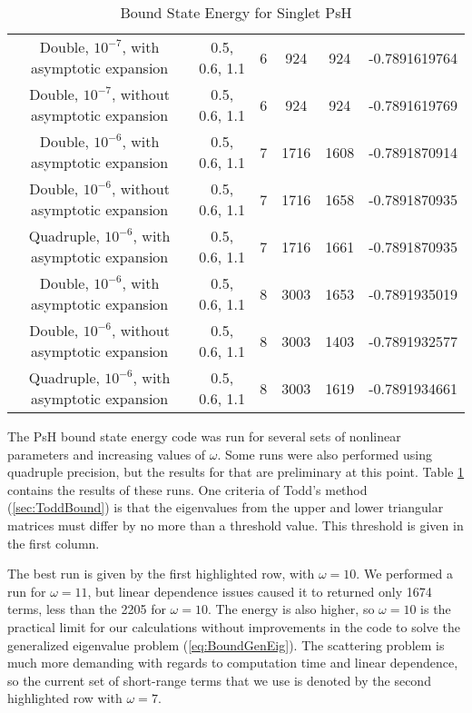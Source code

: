 \documentclass[Dissertation.tex]{subfiles}
\begin{document}
\begin{table}[H]
\begin{center}
\begin{tabular}{|c|c|c|c|c|c|}
Double, $10^{-7}$, with asymptotic expansion & 0.5, 0.6, 1.1 & 6 & 924 & 924 & -0.7891619764\\
Double, $10^{-7}$, without asymptotic expansion & 0.5, 0.6, 1.1 & 6 & 924 & 924 & -0.7891619769\\
\rowcolor{LightCyan}
Double, $10^{-6}$, with asymptotic expansion & 0.5, 0.6, 1.1 & 7 & 1716 & 1608 & -0.7891870914\\
Double, $10^{-6}$, without asymptotic expansion & 0.5, 0.6, 1.1 & 7 & 1716 & 1658 & -0.7891870935\\
Quadruple, $10^{-6}$, with asymptotic expansion & 0.5, 0.6, 1.1 & 7 & 1716 & 1661 & -0.7891870935\\
Double, $10^{-6}$, with asymptotic expansion & 0.5, 0.6, 1.1 & 8 & 3003 & 1653 & -0.7891935019\\
Double, $10^{-6}$, without asymptotic expansion & 0.5, 0.6, 1.1 & 8 & 3003 & 1403 & -0.7891932577\\
Quadruple, $10^{-6}$, with asymptotic expansion & 0.5, 0.6, 1.1 & 8 & 3003 & 1619 & -0.7891934661\\
\hline
\end{tabular}
\caption{Bound State Energy for Singlet PsH}
\label{tab:BoundSingletResults}
\end{center}
\end{table}

The PsH bound state energy code was run for several sets of nonlinear parameters and increasing values of $\omega$.  Some runs were also performed using quadruple precision, but the results for that are preliminary at this point.  Table \ref{tab:BoundSingletResults} contains the results of these runs.  One criteria of Todd's method (\ref{sec:ToddBound}) is that the eigenvalues from the upper and lower triangular matrices must differ by no more than a threshold value.  This threshold is given in the first column.

The best run is given by the first highlighted row, with $\omega = 10$.  We performed a run for $\omega = 11$, but linear dependence issues caused it to returned only 1674 terms, less than the 2205 for $\omega = 10$.  The energy is also higher, so $\omega = 10$ is the practical limit for our calculations without improvements in the code to solve the generalized eigenvalue problem (\ref{eq:BoundGenEig}).  The scattering problem is much more demanding with regards to computation time and linear dependence, so the current set of short-range terms that we use is denoted by the second highlighted row with $\omega = 7$.  
\end{document}
